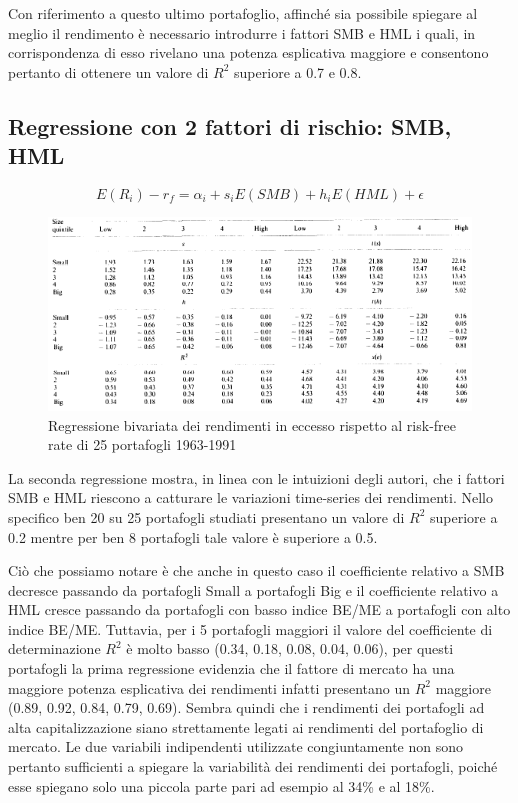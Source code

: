 Con riferimento a questo ultimo portafoglio, affinché sia possibile spiegare al meglio il rendimento è necessario introdurre i fattori SMB e HML i quali, in corrispondenza di esso rivelano una potenza esplicativa maggiore e consentono pertanto di ottenere un valore di $R^2$ superiore a 0.7 e 0.8. 

\subsection{Regressione con 2 fattori di rischio: SMB, HML}

\begin{equation}
E(R_i)-r_f= \alpha_i +s_iE(SMB)+ h_iE(HML) + \epsilon
\end{equation}

\begin{figure} [h!]
	\centering
\includegraphics[width=1\linewidth]{"imgs/due fatt"}
\caption{Regressione bivariata dei rendimenti in eccesso rispetto al risk-free rate di 25 portafogli 1963-1991}
\label{fig:due-fatt}
\end{figure}




La seconda regressione mostra, in linea con le intuizioni degli autori, che i fattori SMB  e HML riescono a catturare le variazioni time-series dei rendimenti. Nello specifico ben 20 su 25 portafogli studiati presentano un valore di $R^2$ superiore a 0.2 mentre per ben 8 portafogli tale valore è superiore a 0.5. 

Ciò che possiamo notare è che anche in questo caso il coefficiente relativo a SMB decresce passando da portafogli Small a portafogli Big e il coefficiente relativo a HML cresce passando da portafogli con basso indice BE/ME a portafogli con alto indice BE/ME. Tuttavia, per i 5 portafogli maggiori il valore del coefficiente di determinazione $R^2$ è molto basso (0.34, 0.18, 0.08, 0.04, 0.06), per questi portafogli la prima regressione evidenzia che il fattore di mercato ha una maggiore potenza esplicativa dei rendimenti infatti presentano un $R^2$ maggiore (0.89, 0.92, 0.84, 0.79, 0.69). Sembra quindi che i rendimenti dei portafogli ad alta capitalizzazione siano strettamente legati ai rendimenti del portafoglio di mercato. Le due variabili indipendenti utilizzate congiuntamente non sono pertanto sufficienti a spiegare la variabilità dei rendimenti dei portafogli, poiché esse spiegano solo una piccola parte pari ad esempio al 34\% e al 18\%. 
